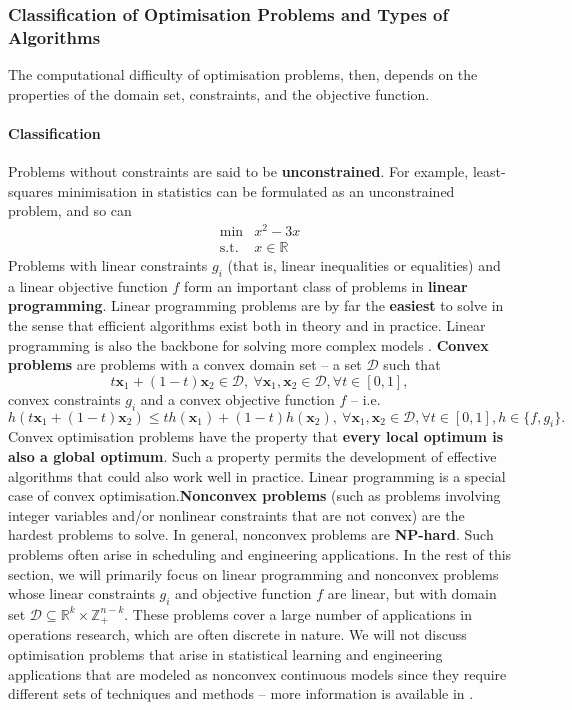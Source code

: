 \subsubsection{Classification of Optimisation Problems and Types of Algorithms}
The computational difficulty of optimisation problems, then, depends on the
properties of the domain set, constraints, and the objective function.
\paragraph{Classification} Problems without constraints are said to be \textbf{unconstrained}. For
example, least-squares minimisation in statistics can be formulated as
an unconstrained problem, and so can \[\begin{array}{rl}
\min & x^2 - 3x \\
\mbox{s.t.} & x \in \mathbb{R}
\end{array}\]
Problems with linear constraints $g_i$ (that is, linear inequalities or
equalities) and a linear objective function $f$ form an important class of
problems in \textbf{linear programming}. Linear programming problems are by far 
the \textbf{easiest} to solve in the sense that efficient algorithms exist
both in theory and in practice. Linear programming is also the backbone
for solving more complex models  \cite{OPT_BT}.
\newpage\noindent
\textbf{Convex problems} are problems with a convex domain set -- a set $\mathcal{D}$ such that $$t\mathbf{x}_1+(1-t)\mathbf{x}_2\in \mathcal{D},\ \forall \mathbf{x}_1,\mathbf{x}_2\in \mathcal{D},\forall t\in [0,1],$$ convex
constraints $g_i$ and a convex objective function $f$ -- i.e.  $$h(t\mathbf{x}_1+(1-t)\mathbf{x}_2)\leq th(\mathbf{x}_1)+(1-t)h(\mathbf{x}_2),\ \forall \mathbf{x}_1,\mathbf{x}_2\in \mathcal{D},\forall t\in [0,1], h\in \{f,g_i\}.$$ Convex optimisation
problems have the property that \textbf{every local optimum is also a global
optimum}. Such a property permits the development of effective algorithms
that could also work well in practice. Linear programming is a special
case of convex optimisation.\newl \textbf{Nonconvex problems} (such as problems involving integer variables and/or nonlinear constraints that are not convex) are the hardest problems to
solve. In general, nonconvex problems are \textbf{NP-hard}. Such problems often arise in scheduling and engineering applications.
\newl In the rest of this section, we will primarily focus  on linear programming and nonconvex
problems whose linear constraints $g_i$ and objective function $f$ are linear, but with domain set $\mathcal{D}\subseteq \mathbb{R}^k \times \mathbb{Z}_+^{n-k}$. These
problems cover a large number of applications in operations research, 
which are often discrete in nature.
\newl We will not discuss optimisation problems that arise in statistical learning and engineering
applications that are modeled as nonconvex continuous models since they require different sets of techniques
and methods -- more information is available in \cite{OPT_B}.


